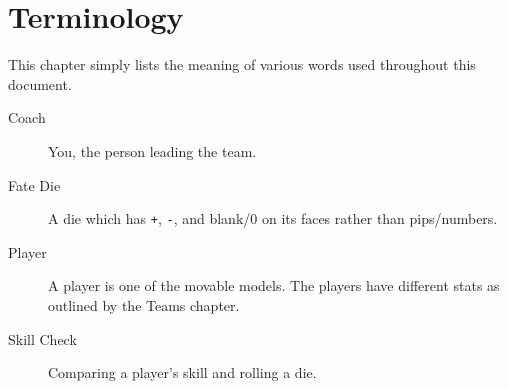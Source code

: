 \chapter{Terminology}
This chapter simply lists the meaning of various words used throughout this document.

\begin{description}
\item[Coach] You, the person leading the team.
\item[Fate Die] A die which has \texttt{+}, \texttt{-}, and blank/0 on its faces rather than pips/numbers.
\item[Player] A player is one of the movable models.
The players have different stats as outlined by the Teams chapter.
\item[Skill Check] Comparing a player's skill and rolling a \fate{} die.
\end{description}